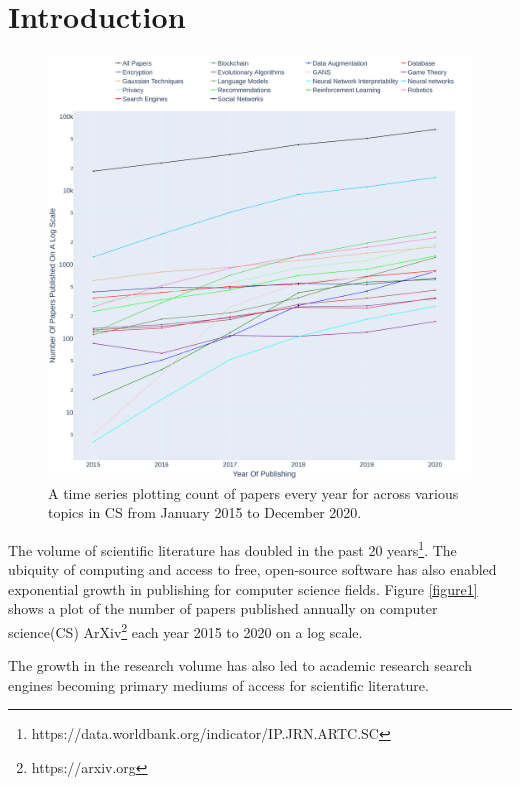 \chapter{Introduction}

\begin{figure}[h]
    \centering
    \includegraphics[width=\maxwidth{\textwidth}]{src/images/Paper-Publishing-Trend.pdf}
    \caption{ A time series plotting count of papers every year for across various topics in CS from January 2015 to December 2020. }
    \label{figure\arabic{figurecounter}}
\end{figure}

The volume of scientific literature has doubled in the past 20 years\footnote{https://data.worldbank.org/indicator/IP.JRN.ARTC.SC}.  
The ubiquity of computing and access to free, open-source software has also enabled exponential growth in publishing for computer science fields.  
Figure \ref{figure1} shows a plot of the number of papers published annually on computer science(CS) ArXiv\footnote{https://arxiv.org} each year 2015 to 2020 on a log scale. 


The growth in the research volume has also led to academic research search engines becoming primary mediums of access for scientific literature. 

